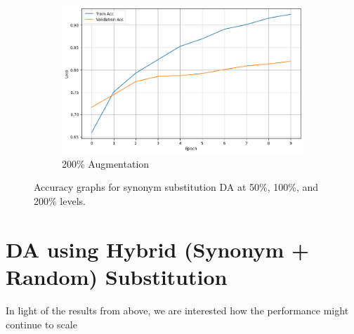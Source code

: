 \documentclass{article}
\begin{document}
\begin{figure}[ht]
\begin{subfigure}[b]{0.3\textwidth}
    \includegraphics[width=\textwidth]{img/synonym_100.png}
    \caption{200\% Augmentation}
    \label{fig:synonym_100}
  \end{subfigure}
  \caption{Accuracy graphs for synonym substitution DA at 50\%, 100\%, and 200\% levels.}
  \label{fig:synonym_extreme_substitution_acc}
\end{figure}

\section{DA using Hybrid (Synonym + Random) Substitution}

In light of the results from above, we are interested how the performance might
continue to scale
\end{document}
